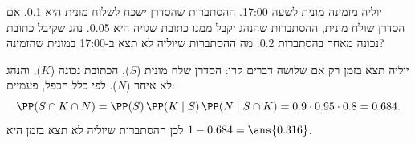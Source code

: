 יוליה מזמינה מונית לשעה 17:00. ההסתברות שהסדרן ישכח לשלוח מונית היא 0.1. אם הסדרן שולח מונית, ההסתברות שהנהג יקבל ממנו כתובת שגויה היא 0.05. נהג שקיבל כתובת נכונה מאחר בהסתברות 0.2. מה ההסתברות שיוליה לא תצא ב-17:00 במונית שהזמינה?
\begin{solbox}
יוליה תצא בזמן רק אם שלושה דברים קרו: הסדרן שלח מונית ($S$), הכתובת נכונה ($K$), והנהג לא איחר ($N$). לפי כלל הכפל, פעמיים:
\[
\PP(S\cap K\cap N)=\PP(S)\,\PP(K\mid S)\,\PP(N\mid S\cap K)=0.9\cdot0.95\cdot0.8=0.684.
\]
לכן ההסתברות שיוליה לא תצא בזמן היא $1-0.684=\ans{0.316}$.
\end{solbox}
